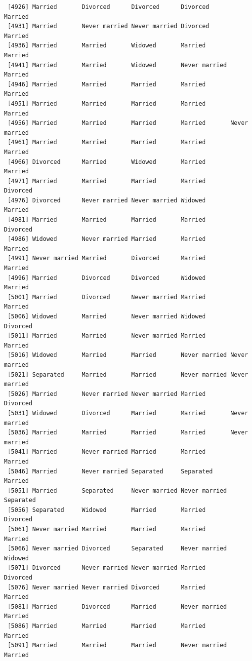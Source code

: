\documentclass[
  letterpaper,
  DIV=11,
  numbers=noendperiod,
  oneside]{scrartcl}
\begin{document}
\begin{verbatim}
 [4926] Married       Divorced      Divorced      Divorced      Married      
 [4931] Married       Never married Never married Divorced      Married      
 [4936] Married       Married       Widowed       Married       Married      
 [4941] Married       Married       Widowed       Never married Married      
 [4946] Married       Married       Married       Married       Married      
 [4951] Married       Married       Married       Married       Married      
 [4956] Married       Married       Married       Married       Never married
 [4961] Married       Married       Married       Married       Married      
 [4966] Divorced      Married       Widowed       Married       Married      
 [4971] Married       Married       Married       Married       Divorced     
 [4976] Divorced      Never married Never married Widowed       Married      
 [4981] Married       Married       Married       Married       Divorced     
 [4986] Widowed       Never married Married       Married       Married      
 [4991] Never married Married       Divorced      Married       Married      
 [4996] Married       Divorced      Divorced      Widowed       Married      
 [5001] Married       Divorced      Never married Married       Married      
 [5006] Widowed       Married       Never married Widowed       Divorced     
 [5011] Married       Married       Never married Married       Married      
 [5016] Widowed       Married       Married       Never married Never married
 [5021] Separated     Married       Married       Never married Never married
 [5026] Married       Never married Never married Married       Divorced     
 [5031] Widowed       Divorced      Married       Married       Never married
 [5036] Married       Married       Married       Married       Never married
 [5041] Married       Never married Married       Married       Married      
 [5046] Married       Never married Separated     Separated     Married      
 [5051] Married       Separated     Never married Never married Separated    
 [5056] Separated     Widowed       Married       Married       Divorced     
 [5061] Never married Married       Married       Married       Married      
 [5066] Never married Divorced      Separated     Never married Widowed      
 [5071] Divorced      Never married Never married Married       Divorced     
 [5076] Never married Never married Divorced      Married       Married      
 [5081] Married       Divorced      Married       Never married Married      
 [5086] Married       Married       Married       Married       Married      
 [5091] Married       Married       Married       Never married Married      

\end{verbatim}
\end{document}
